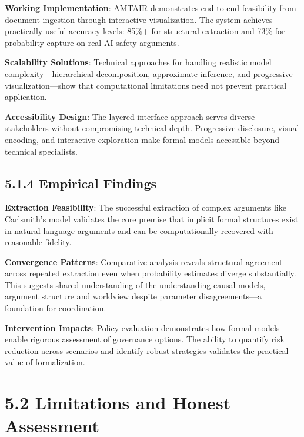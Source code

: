\documentclass[
  11pt,
  letterpaper,
]{book}
\begin{document}
\textbf{Working Implementation}: AMTAIR demonstrates end-to-end
feasibility from document ingestion through interactive visualization.
The system achieves practically useful accuracy levels: 85\%+ for
structural extraction and 73\% for probability capture on real AI safety
arguments.

\textbf{Scalability Solutions}: Technical approaches for handling
realistic model complexity---hierarchical decomposition, approximate
inference, and progressive visualization---show that computational
limitations need not prevent practical application.

\textbf{Accessibility Design}: The layered interface approach serves
diverse stakeholders without compromising technical depth. Progressive
disclosure, visual encoding, and interactive exploration make formal
models accessible beyond technical specialists.

\subsection*{5.1.4 Empirical Findings}\label{sec-empirical-findings}

\textbf{Extraction Feasibility}: The successful extraction of complex
arguments like Carlsmith's model validates the core premise that
implicit formal structures exist in natural language arguments and can
be computationally recovered with reasonable fidelity.

\textbf{Convergence Patterns}: Comparative analysis reveals structural
agreement across repeated extraction even when probability estimates
diverge substantially. This suggests shared understanding of the
understanding causal models, argument structure and worldview despite
parameter disagreements---a foundation for coordination.

\textbf{Intervention Impacts}: Policy evaluation demonstrates how formal
models enable rigorous assessment of governance options. The ability to
quantify risk reduction across scenarios and identify robust strategies
validates the practical value of formalization.

\section*{5.2 Limitations and Honest
Assessment}\label{sec-limitations-assessment}

\end{document}
